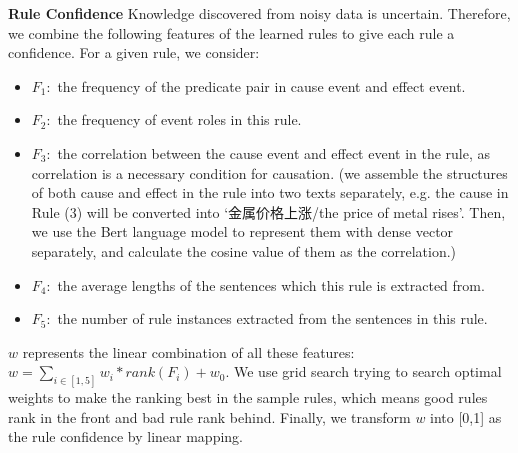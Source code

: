 \noindent
\textbf{Rule Confidence}
Knowledge discovered from noisy data is uncertain. Therefore, we combine the following features of the learned rules to give each rule a confidence. For a given rule, we consider:
\begin{itemize}
\item $F_1:$ the frequency of the predicate pair in cause event and effect event.
\item $F_2:$ the frequency of event roles in this rule.
\item $F_3:$ the correlation between the cause event and effect event in the rule, as correlation is a necessary condition for causation. (we assemble the structures of both cause and effect in the rule into two texts separately, e.g. the cause in Rule (3) will be converted into `金属价格上涨/the price of metal rises'. Then, we use the Bert \cite{devlin2018bert} language model to represent them with dense vector separately, and calculate the cosine value of them as the correlation.)
\item $F_4:$ the average lengths of the sentences which this rule is extracted from.
\item $F_5:$ the number of rule instances extracted from the sentences in this rule. 
\end{itemize}

$w$ represents the linear combination of all these features: $w=\sum_{i\in[1,5]}w_i*rank(F_i)+w_0$.
We use grid search trying to search optimal weights to make the ranking best in the sample rules, which means good rules rank in the front and bad rule rank behind.
Finally, we transform $w$ into [0,1] as the rule confidence by linear mapping.

